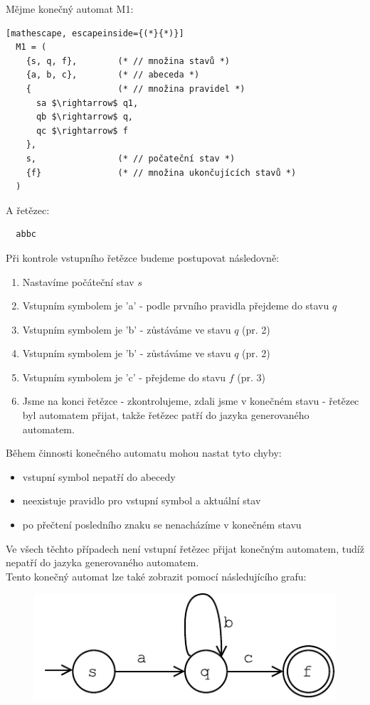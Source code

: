 \begin{exmp}
  Mějme konečný automat M1:
  \begin{lstlisting}[mathescape, escapeinside={(*}{*)}]
  M1 = (
    {s, q, f},        (* // množina stavů *)
    {a, b, c},        (* // abeceda *)
    {                 (* // množina pravidel *)
      sa $\rightarrow$ q1,
      qb $\rightarrow$ q,
      qc $\rightarrow$ f
    },
    s,                (* // počateční stav *)
    {f}               (* // množina ukončujících stavů *)
  )
  \end{lstlisting}
  A řetězec:
\begin{lstlisting}
  abbc
\end{lstlisting}

\noindent
Při kontrole vstupního řetězce budeme postupovat následovně:

\begin{enumerate}
  \item Nastavíme počáteční stav $s$
  \item Vstupním symbolem je 'a' - podle prvního pravidla přejdeme do stavu $q$
  \item Vstupním symbolem je 'b' - zůstáváme ve stavu $q$ (pr. 2)
  \item Vstupním symbolem je 'b' - zůstáváme ve stavu $q$ (pr. 2)
  \item Vstupním symbolem je 'c' - přejdeme do stavu $f$ (pr. 3)
  \item Jsme na konci řetězce - zkontrolujeme, zdali jsme v konečném stavu - řetězec byl automatem přijat,
  takže řetězec patří do jazyka generovaného automatem.
\end{enumerate}

\noindent
Během činnosti konečného automatu mohou nastat tyto chyby:

\begin{itemize}
  \item vstupní symbol nepatří do abecedy
  \item neexistuje pravidlo pro vstupní symbol a aktuální stav
  \item po přečtení posledního znaku se nenacházíme v konečném stavu
\end{itemize}
Ve všech těchto případech není vstupní řetězec přijat konečným automatem, tudíž nepatří
do jazyka generovaného automatem.\\

\noindent
Tento konečný automat lze také zobrazit pomocí následujícího grafu:

\begin{figure}[H]
  \centering
  \includegraphics{fig/finiteAutomat.pdf}
\end{figure}

\end{exmp}

